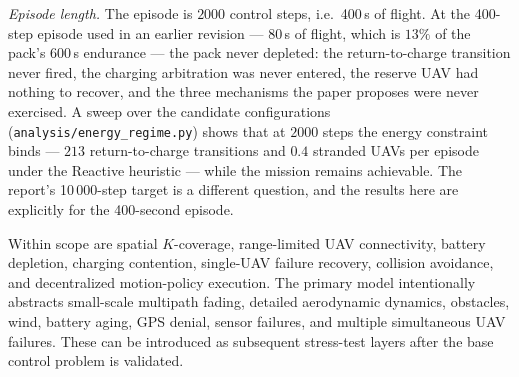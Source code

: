 \documentclass[conference]{IEEEtran}
\newcommand{\tokEpisodeSeconds}{400}
\newcommand{\tokEpisodeSteps}{2000}
\newcommand{\tokOldEpisodePct}{13}
\newcommand{\tokOldEpisodeS}{80}
\newcommand{\tokPackEndurance}{600}
\newcommand{\tokReactRet}{213}
\newcommand{\tokReactStr}{0.4}
\begin{document}
\emph{Episode length.} The episode is $\tokEpisodeSteps$ control steps, i.e.\ \tokEpisodeSeconds\,s of flight. At the 400-step episode used in an earlier revision --- \tokOldEpisodeS\,s of flight, which is $\tokOldEpisodePct\%$ of the pack's $\tokPackEndurance$\,s endurance --- the pack never depleted: the return-to-charge transition never fired, the charging arbitration was never entered, the reserve UAV had nothing to recover, and the three mechanisms the paper proposes were never exercised. A sweep over the candidate configurations (\texttt{analysis/energy\_regime.py}) shows that at $\tokEpisodeSteps$ steps the energy constraint binds --- $\tokReactRet$ return-to-charge transitions and $\tokReactStr$ stranded UAVs per episode under the Reactive heuristic --- while the mission remains achievable. The report's 10\,000-step target is a different question, and the results here are explicitly for the \tokEpisodeSeconds-second episode.

Within scope are spatial $K$-coverage, range-limited UAV connectivity, battery depletion, charging contention, single-UAV failure recovery, collision avoidance, and decentralized motion-policy execution. The primary model intentionally abstracts small-scale multipath fading, detailed aerodynamic dynamics, obstacles, wind, battery aging, GPS denial, sensor failures, and multiple simultaneous UAV failures. These can be introduced as subsequent stress-test layers after the base control problem is validated.
\end{document}
